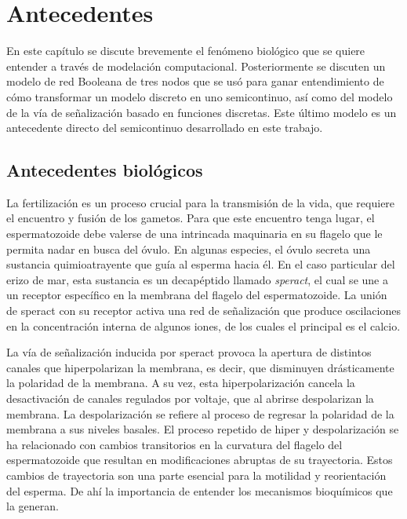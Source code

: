 \chapter{Antecedentes}\label{ch:antecedentes}

En este capítulo se discute brevemente el fenómeno biológico que se quiere entender a través de modelación computacional. Posteriormente se discuten un modelo de red Booleana de tres nodos que se usó para ganar entendimiento de cómo transformar un modelo discreto en uno semicontinuo, así como del modelo de la vía de señalización basado en funciones discretas. Este último modelo es un antecedente directo del semicontinuo desarrollado en este trabajo.

\section{Antecedentes biol\'ogicos}

La fertilización es un proceso crucial para la transmisión de la vida, que requiere el encuentro y fusión de los gametos. Para que este encuentro tenga lugar, el espermatozoide debe valerse de una intrincada maquinaria en su flagelo que le permita nadar en busca del óvulo. En algunas especies, el óvulo secreta una sustancia quimioatrayente que guía al esperma hacia él. En el caso particular del erizo de mar, esta sustancia es un decapéptido llamado \emph{speract}, el cual se une a un receptor específico en la membrana del flagelo del espermatozoide. La unión de speract con su receptor activa una red de señalización que produce oscilaciones en la concentración interna de algunos iones, de los cuales el principal es el calcio. 

La vía de señalización inducida por speract provoca la apertura de distintos canales que hiperpolarizan la membrana, es decir, que disminuyen drásticamente la polaridad de la membrana. A su vez, esta hiperpolarización cancela la desactivación de canales regulados por voltaje, que al abrirse despolarizan la membrana. La despolarización se refiere al proceso de regresar la polaridad de la membrana a sus niveles basales. El proceso repetido de hiper y despolarización se ha relacionado con cambios transitorios en la curvatura del flagelo del espermatozoide que resultan en modificaciones abruptas de su trayectoria. Estos cambios de trayectoria son una parte esencial para la motilidad y reorientación del esperma. De ahí la importancia de entender los mecanismos bioquímicos que la generan. 

